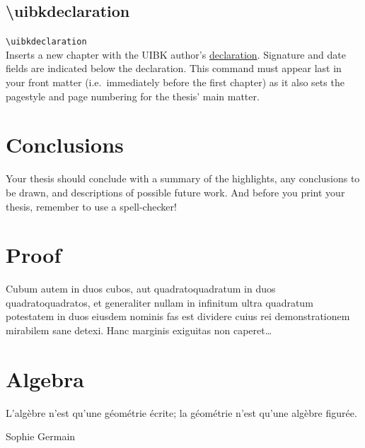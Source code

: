 \documentclass[bachelor]{iisthesis}
\begin{document}
\section{\textbackslash uibkdeclaration}
\texttt{\textbackslash uibkdeclaration}\\[\baselineskip]
Inserts a new chapter with the UIBK author's \hyperref[chap:declare]{declaration}. Signature and date fields are indicated below the declaration. This command must appear last in your front matter (i.e.\ immediately before the first chapter) as it also sets the pagestyle and page numbering for the thesis' main matter.

\chapter{Conclusions}
Your thesis should conclude with a summary of the highlights, any conclusions to be drawn, and descriptions of possible future work. And before you print your thesis, remember to use a spell-checker!


\appendix%

\chapter{Proof}
Cubum autem in duos cubos, aut quadratoquadratum in duos quadratoquadratos, et generaliter nullam in infinitum ultra quadratum potestatem in duos eiusdem nominis fas est dividere cuius rei demonstrationem mirabilem sane detexi. Hanc marginis exiguitas non caperet\ldots

\chapter{Algebra}
L'alg\`ebre n'est qu'une g\'eom\'etrie \'ecrite; la g\'eom\'etrie n'est qu'une alg\`ebre figur\'ee.

\hfill Sophie Germain
\end{document}
